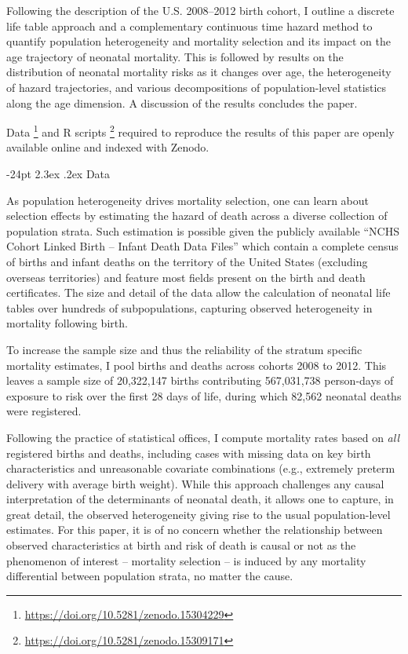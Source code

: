 \documentclass[10pt,twoside,reqno]{article}
\makeatletter
\renewcommand\section{\@startsection {section}{1}{\z@}%
                                   {-24pt}%
                                   {2.3ex \@plus.2ex}%
                                   {\normalfont\large\bfseries}}
\let\oldfootnote\footnote
\renewcommand\footnote[1]{%
\oldfootnote{\hspace{0.6mm}#1}}
\makeatother
\begin{document}
Following the description of the U.S. 2008--2012 birth cohort, I outline a discrete life table approach and a complementary continuous time hazard method to quantify population heterogeneity and mortality selection and its impact on the age trajectory of neonatal mortality. This is followed by results on the distribution of neonatal mortality risks as it changes over age, the heterogeneity of hazard trajectories, and various decompositions of population-level statistics along the age dimension. A discussion of the results concludes the paper.

Data\footnote{\href{https://zenodo.org/records/15304230}{https://doi.org/10.5281/zenodo.15304229}} and R scripts\footnote{\href{https://zenodo.org/records/15309172}{https://doi.org/10.5281/zenodo.15309171}} required to reproduce the results of this paper are openly available online and indexed with Zenodo.

\section{Data}\label{data}

As population heterogeneity drives mortality selection, one can learn about selection effects by estimating the hazard of death across a diverse collection of population strata. Such estimation is possible given the publicly available ``NCHS Cohort Linked Birth -- Infant Death Data Files'' \citep{NCHS2016} which contain a complete census of births and infant deaths on the territory of the United States (excluding overseas territories) and feature most fields present on the birth and death certificates. The size and detail of the data allow the calculation of neonatal life tables over hundreds of subpopulations, capturing observed heterogeneity in mortality following birth.

To increase the sample size and thus the reliability of the stratum specific mortality estimates, I pool births and deaths across cohorts 2008 to 2012. This leaves a sample size of 20,322,147 births contributing 567,031,738 person-days of exposure to risk over the first 28 days of life, during which 82,562 neonatal deaths were registered.

Following the practice of statistical offices, I compute mortality rates based on \emph{all} registered births and deaths, including cases with missing data on key birth characteristics and unreasonable covariate combinations (e.g., extremely preterm delivery with average birth weight). While this approach challenges any causal interpretation of the determinants of neonatal death, it allows one to capture, in great detail, the observed heterogeneity giving rise to the usual population-level estimates. For this paper, it is of no concern whether the relationship between observed characteristics at birth and risk of death is causal or not as the phenomenon of interest -- mortality selection -- is induced by any mortality differential between population strata, no matter the cause.
\end{document}

